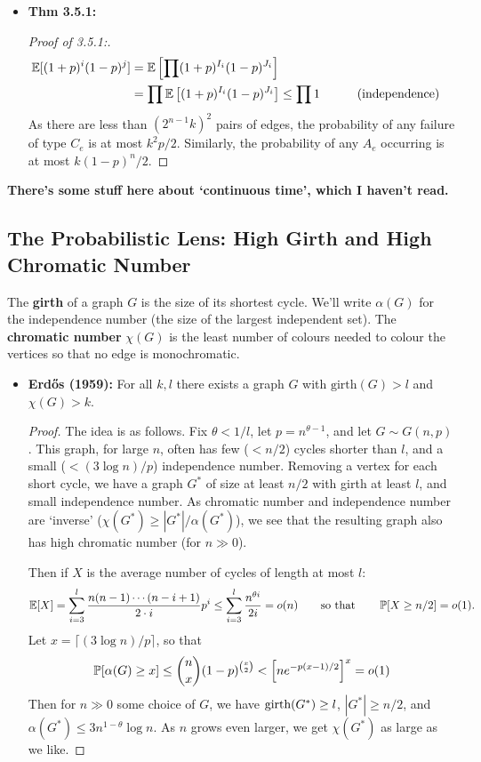 \documentclass[11pt]{article}
\newenvironment{INT}[1][]{\begin{itemize}\small\item\textbf{#1}}{\end{itemize}}
\begin{document}
\begin{chapter3}
\begin{itemise}
\begin{INT}[Thm 3.5.1:]
\begin{proof}[Proof of 3.5.1:]
\begin{alignat*}{2}
\Exp[(1+p)^i(1-p)^j]&=\Exp\left[\prod (1+p)^{I_i}(1-p)^{J_i}\right]%
\\&=\prod \Exp\left[(1+p)^{I_i}(1-p)^{J_i}\right]\leq\prod1
&\qquad&\text{(independence)}
\end{alignat*}
As there are less than $(2^{n-1}k)^2$ pairs of edges, the probability of any failure of type $C_e$ is at most $k^2p/2$. Similarly, the probability of any $A_e$ occurring is at most $k(1-p)^n/2$.
\end{proof}
\end{INT}
\item \textbf{There's some stuff here about `continuous time', which I haven't read.}
\end{itemise}
\subsection*{The Probabilistic Lens: High Girth and High Chromatic Number}
The \textbf{girth} of a graph $G$ is the size of its shortest cycle. We'll write $\alpha(G)$ for the independence number (the size of the largest independent set). The \textbf{chromatic number} $\chi(G)$ is the least number of colours needed to colour the vertices so that no edge is monochromatic.
\begin{INT}[Erd\H{o}s (1959):]
For all $k,l$ there exists a graph $G$ with $\text{girth}(G)>l$ and $\chi(G)>k$.
\begin{proof}
The idea is as follows. Fix $\theta<1/l$, let $p=n^{\theta-1}$, and let $G\sim G(n,p)$. This graph, for large $n$, often has few ($<n/2$) cycles shorter than $l$, and a small ($<(3\log n)/p$) independence number. Removing a vertex for each short cycle, we have a graph $G^*$ of size at least $n/2$ with girth at least $l$, and small independence number. As chromatic number and independence number are `inverse' ($\chi(G^*)\geq|G^*|/\alpha(G^*)$), we see that the resulting graph also has high chromatic number (for $n\gg0$).

 Then if $X$ is the average number of cycles of length at most $l$:
\[\operatorname{\mathbb{E}}[X]=\sum_{i=3}^l\frac{n(n-1)\cdots (n-i+1)}{2\cdot i}p^i\leq \sum_{i=3}^l\frac{n^{\theta i}}{2i}=o(n)\textup{\qquad so that\qquad}\operatorname{\mathbb{P}}[X\geq n/2]=o(1).\]
Let $x=\lceil (3\log n)/p\rceil$, so that
\[\operatorname{\mathbb{P}}[\alpha(G)\geq x]\leq{n\choose x}(1-p)^{x\choose2}<\left[ne^{-p(x-1)/2}\right]^x=o(1)\]
Then for $n\gg0$ some choice of $G$, we have $\textup{girth}(G^*)\geq l$, $|G^*|\geq n/2$, and $\alpha(G^*)\leq 3n^{1-\theta}\log n$. As $n$ grows even larger, we get $\chi(G^*)$ as large as we like.
\end{proof}
\end{INT}
\end{chapter3}
\end{document}
